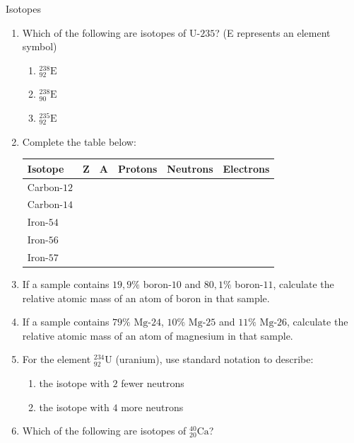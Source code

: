 \begin{exercises}  {Isotopes }
\begin{enumerate}[noitemsep, label=\textbf{\arabic*}. ]
                \label{m38753*uid64}\item Which of the following are isotopes of $\text{U-}235$? (E represents an element symbol)
\label{m38753*id258452}\begin{enumerate}[noitemsep, label=\textbf{\alph*}. ] 
            \label{m38753*uid65}\item $_{92}^{238}\text{E}$
\label{m38753*uid66}\item $_{90}^{238}\text{E}$
\label{m38753*uid67}\item $_{92}^{235}\text{E}$
\end{enumerate}
            \label{m38753*uid619}\item Complete the table below:
          \begin{center}
\begin{tabular}{|p{2cm}|p{1cm}|p{1cm}|p{1.4cm}|p{1.4cm}|p{1.4cm}|}\hline
\textbf{Isotope} & \textbf{Z} & \textbf{A} & \textbf{Protons} & \textbf{Neutrons} & \textbf{Electrons}\\\hline
Carbon-$12$ & & & & & \\\hline
Carbon-$14$ & & & & & \\\hline
Iron-$54$ & & & & & \\\hline
Iron-$56$ & & & & & \\\hline
Iron-$57$ & & & & & \\ \hline
\end{tabular}
\end{center}
\item If a sample contains $19,9\%$ boron-$10$ and $80,1\%$ boron-$11$, calculate the relative atomic mass of an atom of boron in that sample.
\hspace{1ex}    
\label{m38753*uid7100}\item If a sample contains $79\% \text{ Mg-}24$, $10\% \text{ Mg-}25$ and $11\% \text{ Mg-}26$, calculate the relative atomic mass of an atom of magnesium in that sample.
\item For the element $^{234}_{92}{\text{U}}$ (uranium), use standard notation to describe:
\begin{enumerate}[noitemsep, label=\textbf{\alph*}. ]
 \item the isotope with $2$ fewer neutrons
 \item the isotope with $4$ more neutrons
\end{enumerate}
\item Which of the following are isotopes of $^{40}_{20}\text{Ca}$?

\end{enumerate}
\end{exercises}
